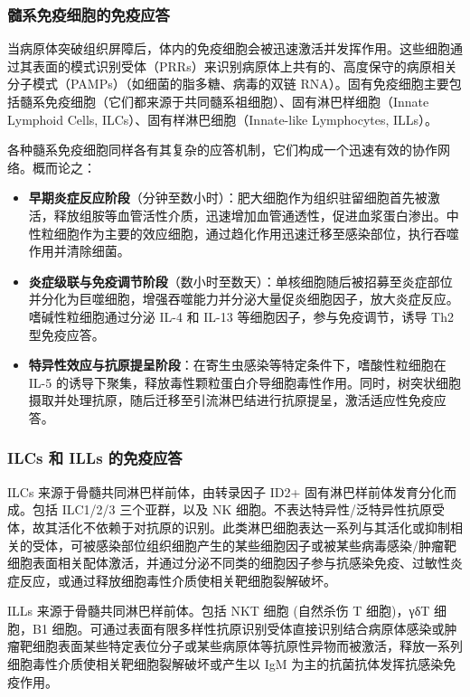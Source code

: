 \documentclass[9pt,a4paper,twoside]{rho-class/rho}
\begin{document}
    \subsubsection{髓系免疫细胞的免疫应答}

    当病原体突破组织屏障后，体内的免疫细胞会被迅速激活并发挥作用。这些细胞通过其表面的模式识别受体（PRRs）来识别病原体上共有的、高度保守的病原相关分子模式（PAMPs）（如细菌的脂多糖、病毒的双链 RNA）。固有免疫细胞主要包括髓系免疫细胞（它们都来源于共同髓系祖细胞）、固有淋巴样细胞（Innate Lymphoid Cells, ILCs）、固有样淋巴细胞（Innate-like Lymphocytes, ILLs）。

    各种髓系免疫细胞同样各有其复杂的应答机制，它们构成一个迅速有效的协作网络。概而论之：
    
        \begin{itemize}
            \item \textbf{早期炎症反应阶段}（分钟至数小时）：肥大细胞作为组织驻留细胞首先被激活，释放组胺等血管活性介质，迅速增加血管通透性，促进血浆蛋白渗出。中性粒细胞作为主要的效应细胞，通过趋化作用迅速迁移至感染部位，执行吞噬作用并清除细菌。
            \item \textbf{炎症级联与免疫调节阶段}（数小时至数天）：单核细胞随后被招募至炎症部位并分化为巨噬细胞，增强吞噬能力并分泌大量促炎细胞因子，放大炎症反应。嗜碱性粒细胞通过分泌 IL-4 和 IL-13 等细胞因子，参与免疫调节，诱导 Th2 型免疫应答。
            \item \textbf{特异性效应与抗原提呈阶段}：在寄生虫感染等特定条件下，嗜酸性粒细胞在 IL-5 的诱导下聚集，释放毒性颗粒蛋白介导细胞毒性作用。同时，树突状细胞摄取并处理抗原，随后迁移至引流淋巴结进行抗原提呈，激活适应性免疫应答。
        \end{itemize}

    \subsubsection{ILCs 和 ILLs 的免疫应答}

    ILCs 来源于骨髓共同淋巴样前体，由转录因子 ID2+ 固有淋巴样前体发育分化而成。包括 ILC1/2/3 三个亚群，以及 NK 细胞。不表达特异性/泛特异性抗原受体，故其活化不依赖于对抗原的识别。此类淋巴细胞表达一系列与其活化或抑制相关的受体，可被感染部位组织细胞产生的某些细胞因子或被某些病毒感染/肿瘤靶细胞表面相关配体激活，并通过分泌不同类的细胞因子参与抗感染免疫、过敏性炎症反应，或通过释放细胞毒性介质使相关靶细胞裂解破坏。
    
    ILLs 来源于骨髓共同淋巴样前体。包括 NKT 细胞 (自然杀伤 T 细胞)，γδT 细胞，B1 细胞。可通过表面有限多样性抗原识别受体直接识别结合病原体感染或肿瘤靶细胞表面某些特定表位分子或某些病原体等抗原性异物而被激活，释放一系列细胞毒性介质使相关靶细胞裂解破坏或产生以 IgM 为主的抗菌抗体发挥抗感染免疫作用。
\end{document}
